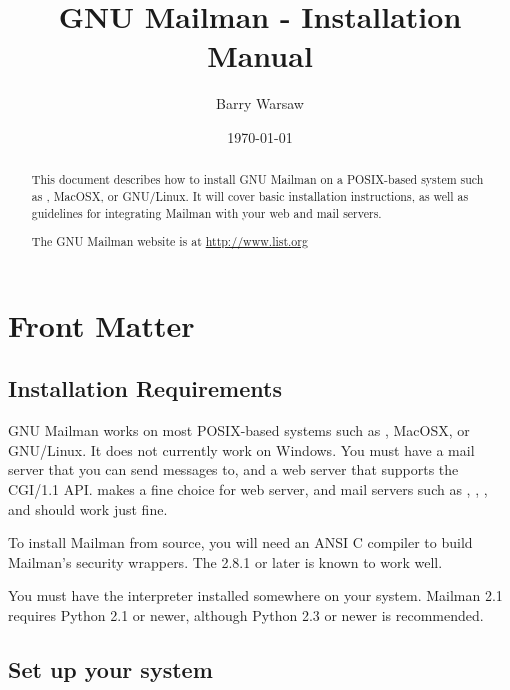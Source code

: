 \documentclass{howto}
\title{GNU Mailman - Installation Manual}
\author{Barry Warsaw}
\date{\today}
\begin{document}
\maketitle

%
\ifhtml
\chapter*{Front Matter\label{front}}
\fi

\begin{abstract}
\noindent
This document describes how to install GNU Mailman on a POSIX-based system
such as \UNIX{}, MacOSX, or GNU/Linux.  It will cover basic installation
instructions, as well as guidelines for integrating Mailman with your web and
mail servers.

\noindent
The GNU Mailman website is at \url{http://www.list.org}
\end{abstract}

%
\tableofcontents


\section{Installation Requirements}

GNU Mailman works on most POSIX-based systems such as \UNIX{}, MacOSX, or
GNU/Linux.  It does not currently work on Windows.  You must have a mail
server that you can send messages to, and a web server that supports the
CGI/1.1 API.   makes a fine choice for
web server, and mail servers such as
,
,
, and
 should
work just fine.

To install Mailman from source, you will need an ANSI C compiler to build
Mailman's security wrappers.  The
 2.8.1 or later is known
to work well.

You must have the  interpreter installed
somewhere on your system.  Mailman 2.1 requires Python 2.1 or newer, although
Python 2.3 or newer is recommended.

\section{Set up your system}
\end{document}
